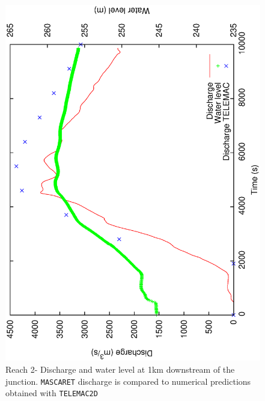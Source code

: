 \documentclass[a4paper,12pt]{article}
\begin{document}
\begin{figure}[!t]
  \begin{center}
  \includegraphics[scale=0.42,angle=-90]{junction_R2}
  \caption{Reach 2- Discharge and water level at 1km downstream of the junction. \texttt{MASCARET} discharge is compared to numerical predictions obtained with \texttt{TELEMAC2D}}
  \label{fig:Discharge-and-water_R2}
  \end{center}
\end{figure}
\end{document}
